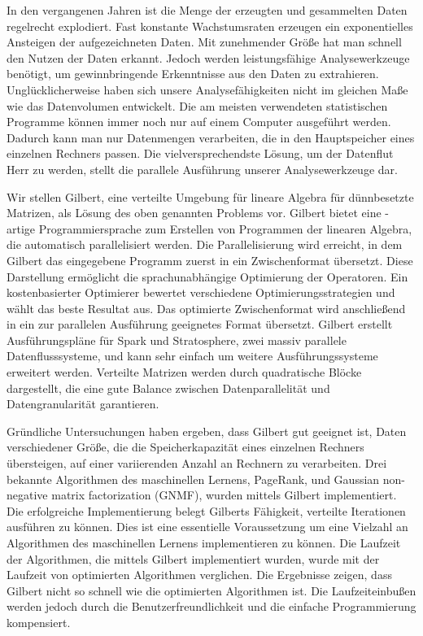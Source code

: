 \clearemptydoublepage
{}
{}	

\vspace*{2cm}
\begin{center}
\end{center}
\vspace{1cm}

In den vergangenen Jahren ist die Menge der erzeugten und gesammelten Daten regelrecht explodiert.
Fast konstante Wachstumsraten erzeugen ein exponentielles Ansteigen der aufgezeichneten Daten.
Mit zunehmender Größe hat man schnell den Nutzen der Daten erkannt.
Jedoch werden leistungsfähige Analysewerkzeuge benötigt, um gewinnbringende Erkenntnisse aus den Daten zu extrahieren.
Unglücklicherweise haben sich unsere Analysefähigkeiten nicht im gleichen Maße wie das Datenvolumen entwickelt.
Die am meisten verwendeten statistischen Programme können immer noch nur auf einem Computer ausgeführt werden.
Dadurch kann man nur Datenmengen verarbeiten, die in den Hauptspeicher eines einzelnen Rechners passen.
Die vielversprechendste Lösung, um der Datenflut Herr zu werden, stellt die parallele Ausführung unserer Analysewerkzeuge dar.

Wir stellen Gilbert, eine verteilte Umgebung für lineare Algebra für dünnbesetzte Matrizen, als Lösung des oben genannten Problems vor.
Gilbert bietet eine \matlab-artige Programmiersprache zum Erstellen von Programmen der linearen Algebra, die automatisch parallelisiert werden.
Die Parallelisierung wird erreicht, in dem Gilbert das eingegebene Programm zuerst in ein Zwischenformat übersetzt.
Diese Darstellung ermöglicht die sprachunabhängige Optimierung der Operatoren.
Ein kostenbasierter Optimierer bewertet verschiedene Optimierungsstrategien und wählt das beste Resultat aus.
Das optimierte Zwischenformat wird anschließend in ein zur parallelen Ausführung geeignetes Format übersetzt.
Gilbert erstellt Ausführungspläne für Spark und Stratosphere, zwei massiv parallele Datenflusssysteme, und kann sehr einfach um weitere Ausführungssysteme erweitert werden. 
Verteilte Matrizen werden durch quadratische Blöcke dargestellt, die eine gute Balance zwischen Datenparallelität und Datengranularität garantieren.

Gründliche Untersuchungen haben ergeben, dass Gilbert gut geeignet ist, Daten verschiedener Größe, die die Speicherkapazität eines einzelnen Rechners übersteigen, auf einer variierenden Anzahl an Rechnern zu verarbeiten.
Drei bekannte Algorithmen des maschinellen Lernens, PageRank, \kmeans und Gaussian non-negative matrix factorization (GNMF), wurden mittels Gilbert implementiert.
Die erfolgreiche Implementierung belegt Gilberts Fähigkeit, verteilte Iterationen ausführen zu können.
Dies ist eine essentielle Voraussetzung um eine Vielzahl an Algorithmen des maschinellen Lernens implementieren zu können.
Die Laufzeit der Algorithmen, die mittels Gilbert implementiert wurden, wurde mit der Laufzeit von optimierten Algorithmen verglichen.
Die Ergebnisse zeigen, dass Gilbert nicht so schnell wie die optimierten Algorithmen ist.
Die Laufzeiteinbußen werden jedoch durch die Benutzerfreundlichkeit und die einfache Programmierung kompensiert.
